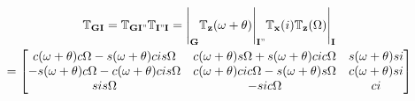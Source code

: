 \begin{multline} \label{eq:ItoG}
\mathbb{T}_{\mathbf{GI}}=\mathbb{T}_{\mathbf{GI"}}\mathbb{T}_{\mathbf{I"I}}=
\Bigg|_{\mathbf{G}}\mathbb{T}_{\mathbf{z}}(\omega+\theta)\Bigg|_{\mathbf{I"}}\mathbb{T}_{\mathbf{x}}(i)\mathbb{T}_{\mathbf{z}}(\Omega)\Bigg|_{\mathbf{I}}\\
=
\begin{bmatrix}
c(\omega+\theta)c\Omega -s(\omega+\theta)ci s\Omega  & c(\omega+\theta)s\Omega +s(\omega+\theta)ci c\Omega  & s(\omega+\theta)si \\
-s(\omega+\theta)c\Omega -c(\omega+\theta)ci s\Omega  & c(\omega+\theta)ci c\Omega -s(\omega+\theta)s\Omega  & c(\omega+\theta)si \\
si s\Omega  & -si c\Omega  & ci \\
\end{bmatrix}
\end{multline}




